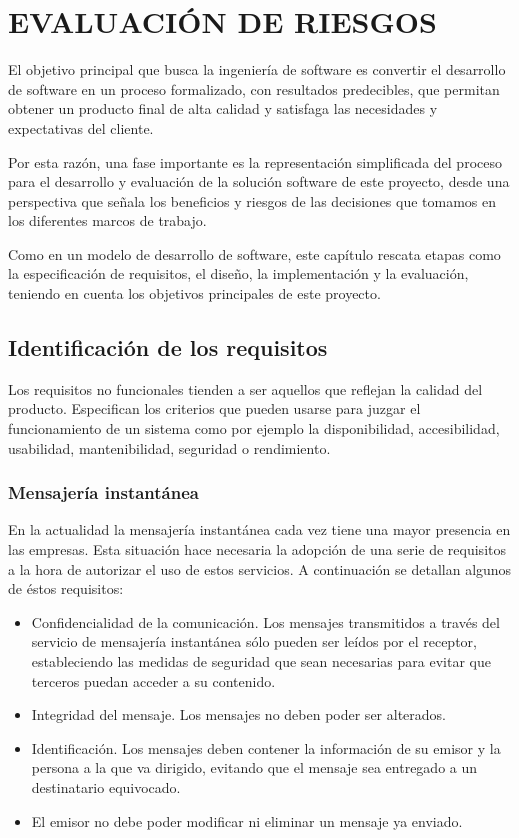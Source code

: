 \chapter{EVALUACIÓN DE RIESGOS\label{sec:disenho}}

El objetivo principal que busca la ingeniería de software es convertir el desarrollo de software en un proceso formalizado, con resultados predecibles, que permitan obtener un producto final de alta calidad y satisfaga las necesidades y expectativas del cliente.

Por esta razón, una fase importante es la representación simplificada del proceso para el desarrollo y evaluación de la solución software de este proyecto, desde una perspectiva que señala los beneficios y riesgos de las decisiones que tomamos en los diferentes marcos de trabajo.

Como en un modelo de desarrollo de software, este capítulo rescata etapas como la especificación de requisitos, el diseño, la implementación y la evaluación, teniendo en cuenta los objetivos principales de este proyecto.

\clearpage

\section{Identificación de los requisitos}

Los requisitos no funcionales tienden a ser aquellos que reflejan la calidad del producto. Especifican los criterios que pueden usarse para juzgar el funcionamiento de un sistema como por ejemplo la disponibilidad, accesibilidad, usabilidad, mantenibilidad, seguridad o rendimiento.

\subsection{Mensajería instantánea}

En la actualidad la mensajería instantánea cada vez tiene una mayor presencia en las empresas. Esta situación hace necesaria la adopción de una serie de requisitos a la hora de autorizar el uso de estos servicios. A continuación se detallan algunos de éstos requisitos:

\begin{itemize}
  \item Confidencialidad de la comunicación. Los mensajes transmitidos a través del servicio de mensajería instantánea sólo pueden ser leídos por el receptor, estableciendo las medidas de seguridad que sean necesarias para evitar que terceros puedan acceder a su contenido.
  \item Integridad del mensaje. Los mensajes no deben poder ser alterados.
  \item Identificación. Los mensajes deben contener la información de su emisor y la persona a la que va dirigido, evitando que el mensaje sea entregado a un destinatario equivocado.
  \item El emisor no debe poder modificar ni eliminar un mensaje ya enviado.
\end{itemize}

